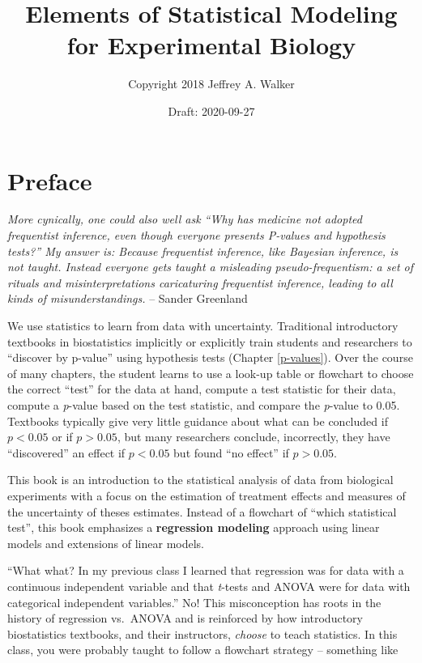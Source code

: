 \documentclass[]{book}
\title{Elements of Statistical Modeling for Experimental Biology}
\author{Copyright 2018 Jeffrey A. Walker}
\date{Draft: 2020-09-27}
\begin{document}
\maketitle

{
\setcounter{tocdepth}{1}
\tableofcontents
}
\hypertarget{preface}{%
\chapter*{Preface}\label{preface}}

\emph{More cynically, one could also well ask ``Why has medicine not adopted frequentist inference, even though everyone presents P-values and hypothesis tests?'' My answer is: Because frequentist inference, like Bayesian inference, is not taught. Instead everyone gets taught a misleading pseudo-frequentism: a set of rituals and misinterpretations caricaturing frequentist inference, leading to all kinds of misunderstandings.} -- Sander Greenland

We use statistics to learn from data with uncertainty. Traditional introductory textbooks in biostatistics implicitly or explicitly train students and researchers to ``discover by p-value'' using hypothesis tests (Chapter \ref{p-values}). Over the course of many chapters, the student learns to use a look-up table or flowchart to choose the correct ``test'' for the data at hand, compute a test statistic for their data, compute a \emph{p}-value based on the test statistic, and compare the \emph{p}-value to 0.05. Textbooks typically give very little guidance about what can be concluded if \(p < 0.05\) or if \(p > 0.05\), but many researchers conclude, incorrectly, they have ``discovered'' an effect if \(p < 0.05\) but found ``no effect'' if \(p > 0.05\).

This book is an introduction to the statistical analysis of data from biological experiments with a focus on the estimation of treatment effects and measures of the uncertainty of theses estimates. Instead of a flowchart of ``which statistical test'', this book emphasizes a \textbf{regression modeling} approach using linear models and extensions of linear models.

``What what? In my previous class I learned that regression was for data with a continuous independent variable and that \emph{t}-tests and ANOVA were for data with categorical independent variables.'' No! This misconception has roots in the history of regression vs.~ANOVA and is reinforced by how introductory biostatistics textbooks, and their instructors, \emph{choose} to teach statistics. In this class, you were probably taught to follow a flowchart strategy -- something like
\end{document}

